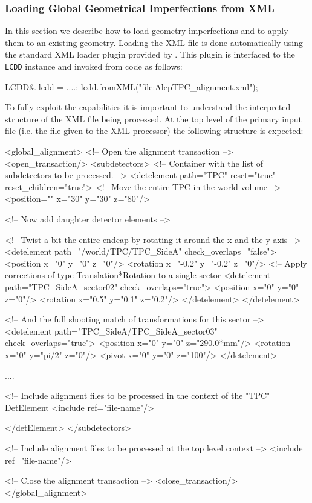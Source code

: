 \documentclass[10pt,a4paper]{article}
\begin{document}
\noindent
\subsubsection{Loading Global Geometrical Imperfections from XML}
\label{sec:ddalign-user-manual-global-misalignment-manip-xml}
\noindent
In this section we describe how to load geometry imperfections and to apply them
to an existing geometry. Loading the XML file is done automatically using the 
standard XML loader plugin provided by \DDhep. This plugin is interfaced to 
the {\tt LCDD} instance and invoked from code as follows:
\begin{code}
    LCDD& lcdd = ....;
    lcdd.fromXML("file:AlepTPC_alignment.xml");
\end{code}
To fully exploit the capabilities it is important to understand the interpreted 
structure of the XML file being processed. At the top level of the primary 
input file (i.e. the file given to the XML processor) the following structure 
is expected:
\begin{code}
<global_alignment>
  <!-- Open the alignment transaction  -->
  <open_transaction/>
  <subdetectors>         <!-- Container with the list of subdetectors to be processed. -->
    <detelement path="TPC" reset="true" reset_children="true">
      <!-- Move the entire TPC in the world volume                                     -->
      <position="" x="30"   y="30"  z="80"/>

      <!-- Now add daughter detector elements                                          -->

      <!-- Twist a bit the entire endcap by rotating it around the x and the y axis    -->
      <detelement path="/world/TPC/TPC_SideA" check_overlaps="false">
        <position x="0"   y="0"  z="0"/>
        <rotation x="-0.2" y="-0.2"  z="0"/>
        <!-- Apply corrections of type Translation*Rotation to a single sector           
        <detelement path="TPC_SideA_sector02" check_overlaps="true">
          <position x="0"   y="0"   z="0"/>
          <rotation x="0.5" y="0.1" z="0.2"/>     
        </detelement>
      </detelement>

      <!-- And the full shooting match of transformations for this sector              -->
      <detelement path="TPC_SideA/TPC_SideA_sector03" check_overlaps="true">
        <position x="0" y="0"    z="290.0*mm"/>
        <rotation x="0" y="pi/2" z="0"/>     
        <pivot    x="0" y="0"    z="100"/>     
      </detelement>

      ....

      <!-- Include alignment files to be processed in the context of the "TPC" DetElement
      <include ref="file-name"/>

    </detElement>            
  </subdetectors>

  <!-- Include alignment files to be processed at the top level context               -->
  <include ref="file-name"/>

  <!-- Close the alignment transaction  -->
  <close_transaction/>
</global_alignment>
\end{code}
\end{document}
